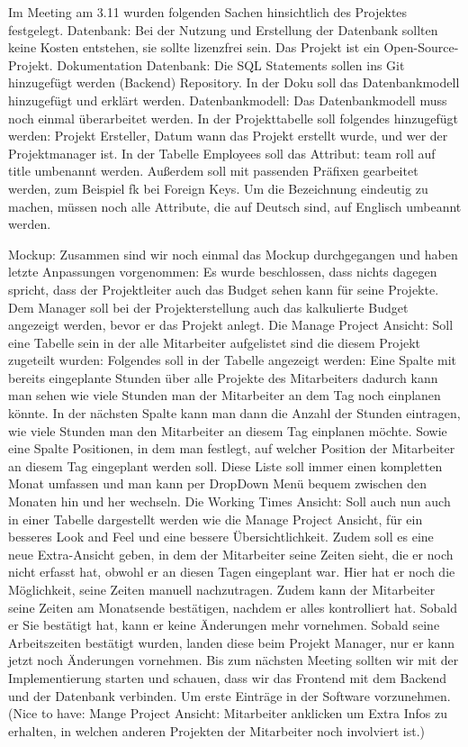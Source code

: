 \documentclass{article}
\begin{document}
Im Meeting am 3.11 wurden folgenden Sachen hinsichtlich des Projektes
festgelegt. Datenbank: Bei der Nutzung und Erstellung der Datenbank sollten
keine Kosten entstehen, sie sollte lizenzfrei sein. Das Projekt ist ein
Open-Source-Projekt. Dokumentation Datenbank: Die SQL Statements sollen ins Git
hinzugefügt werden (Backend) Repository. In der Doku soll das Datenbankmodell
hinzugefügt und erklärt werden. Datenbankmodell: Das Datenbankmodell muss noch
einmal überarbeitet werden. In der Projekttabelle soll folgendes hinzugefügt
werden: Projekt Ersteller, Datum wann das Projekt erstellt wurde, und wer der
Projektmanager ist. In der Tabelle Employees soll das Attribut: team roll auf
title umbenannt werden. Außerdem soll mit passenden Präfixen gearbeitet werden,
zum Beispiel fk bei Foreign Keys. Um die Bezeichnung eindeutig zu machen,
müssen noch alle Attribute, die auf Deutsch sind, auf Englisch umbeannt werden.

Mockup: Zusammen sind wir noch einmal das Mockup durchgegangen und haben letzte
Anpassungen vorgenommen: Es wurde beschlossen, dass nichts dagegen spricht,
dass der Projektleiter auch das Budget sehen kann für seine Projekte. Dem
Manager soll bei der Projekterstellung auch das kalkulierte Budget angezeigt
werden, bevor er das Projekt anlegt. Die Manage Project Ansicht: Soll eine
Tabelle sein in der alle Mitarbeiter aufgelistet sind die diesem Projekt
zugeteilt wurden: Folgendes soll in der Tabelle angezeigt werden: Eine Spalte
mit bereits eingeplante Stunden über alle Projekte des Mitarbeiters dadurch
kann man sehen wie viele Stunden man der Mitarbeiter an dem Tag noch einplanen
könnte. In der nächsten Spalte kann man dann die Anzahl der Stunden eintragen,
wie viele Stunden man den Mitarbeiter an diesem Tag einplanen möchte. Sowie
eine Spalte Positionen, in dem man festlegt, auf welcher Position der
Mitarbeiter an diesem Tag eingeplant werden soll. Diese Liste soll immer einen
kompletten Monat umfassen und man kann per DropDown Menü bequem zwischen den
Monaten hin und her wechseln. Die Working Times Ansicht: Soll auch nun auch in
einer Tabelle dargestellt werden wie die Manage Project Ansicht, für ein
besseres Look and Feel und eine bessere Übersichtlichkeit. Zudem soll es eine
neue Extra-Ansicht geben, in dem der Mitarbeiter seine Zeiten sieht, die er
noch nicht erfasst hat, obwohl er an diesen Tagen eingeplant war. Hier hat er
noch die Möglichkeit, seine Zeiten manuell nachzutragen. Zudem kann der
Mitarbeiter seine Zeiten am Monatsende bestätigen, nachdem er alles
kontrolliert hat. Sobald er Sie bestätigt hat, kann er keine Änderungen mehr
vornehmen. Sobald seine Arbeitszeiten bestätigt wurden, landen diese beim
Projekt Manager, nur er kann jetzt noch Änderungen vornehmen. Bis zum nächsten
Meeting sollten wir mit der Implementierung starten und schauen, dass wir das
Frontend mit dem Backend und der Datenbank verbinden. Um erste Einträge in der
Software vorzunehmen. (Nice to have: Mange Project Ansicht: Mitarbeiter
anklicken um Extra Infos zu erhalten, in welchen anderen Projekten der
Mitarbeiter noch involviert ist.)
\end{document}
